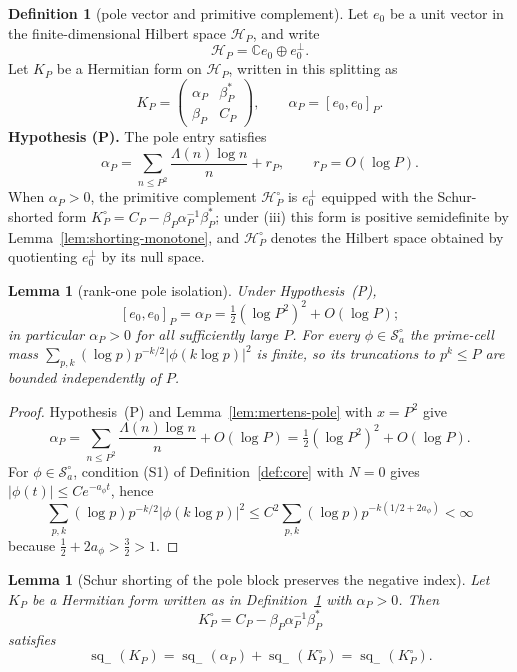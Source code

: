 \documentclass[11pt]{amsart}
\newtheorem{lemma}[theorem]{Lemma}
\theoremstyle{definition}
\newtheorem{definition}[theorem]{Definition}
\theoremstyle{remark}
\theoremstyle{definition}
\newcommand{\half}{\tfrac{1}{2}}
\newcommand{\Lam}{\Lambda}
\newcommand{\sqm}{\operatorname{sq}_-}
\newcommand{\cH}{\mathcal{H}}
\newcommand{\cS}{\mathcal{S}}
\newcommand{\C}{\mathbb{C}}
\begin{document}
\begin{definition}[pole vector and primitive complement]\label{def:pole-vector}
Let $e_0$ be a unit vector in the finite-dimensional Hilbert space $\cH_P$, and write
\[
   \cH_P=\C e_0\oplus e_0^\perp .
\]
Let $K_P$ be a Hermitian form on $\cH_P$, written in this splitting as
\[
   K_P=\begin{pmatrix}\alpha_P&\beta_P^*\\ \beta_P&C_P\end{pmatrix},\qquad \alpha_P=[e_0,e_0]_P .
\]
\textbf{Hypothesis (P).} The pole entry satisfies
\[
   \alpha_P=\sum_{n\le P^2}\frac{\Lam(n)\log n}{n}+r_P,\qquad r_P=O(\log P).
\]
When $\alpha_P>0$, the primitive complement $\cH_P^\circ$ is $e_0^\perp$ equipped with the
Schur-shorted form $K_P^\circ=C_P-\beta_P\alpha_P^{-1}\beta_P^*$; under \textnormal{(iii)} this form is
positive semidefinite by Lemma~\ref{lem:shorting-monotone}, and $\cH_P^\circ$ denotes the Hilbert
space obtained by quotienting $e_0^\perp$ by its null space.
\end{definition}

\begin{lemma}[rank-one pole isolation]\label{lem:pole-isolation}
Under Hypothesis~\textnormal{(P)},
\[
   [e_0,e_0]_P=\alpha_P=\half(\log P^2)^2+O(\log P);
\]
in particular $\alpha_P>0$ for all sufficiently large $P$.  For every $\phi\in\cS_a^\circ$ the
prime-cell mass $\sum_{p,k}(\log p)p^{-k/2}|\phi(k\log p)|^2$ is finite, so its truncations to
$p^k\le P$ are bounded independently of $P$.
\end{lemma}

\begin{proof}
Hypothesis~(P) and Lemma~\ref{lem:mertens-pole} with $x=P^2$ give
\[
   \alpha_P=\sum_{n\le P^2}\frac{\Lam(n)\log n}{n}+O(\log P)
      =\half(\log P^2)^2+O(\log P).
\]
For $\phi\in\cS_a^\circ$, condition \textnormal{(S1)} of Definition~\ref{def:core} with $N=0$ gives
$|\phi(t)|\le Ce^{-a_\phi t}$, hence
\[
   \sum_{p,k}(\log p)p^{-k/2}|\phi(k\log p)|^2
   \le C^2\sum_{p,k}(\log p)p^{-k(1/2+2a_\phi)}<\infty
\]
because $\half+2a_\phi>\tfrac32>1$.
\end{proof}

\begin{lemma}[Schur shorting of the pole block preserves the negative index]\label{lem:short}
Let $K_P$ be a Hermitian form written as in Definition~\ref{def:pole-vector} with $\alpha_P>0$.  Then
\[
   K_P^\circ=C_P-\beta_P\alpha_P^{-1}\beta_P^*
\]
satisfies
\[
   \sqm(K_P)=\sqm(\alpha_P)+\sqm(K_P^\circ)=\sqm(K_P^\circ).
\]
\end{lemma}
\end{document}
